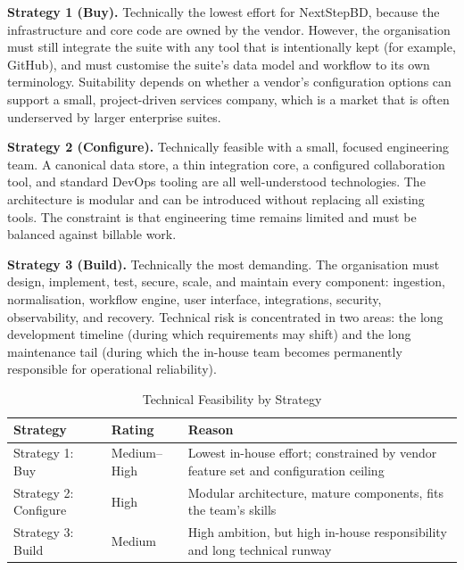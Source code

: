 \documentclass[12pt,a4paper]{report}
\begin{document}
\textbf{Strategy 1 (Buy).} Technically the lowest effort for NextStepBD, because the
infrastructure and core code are owned by the vendor. However, the organisation must still
integrate the suite with any tool that is intentionally kept (for example, GitHub), and must
customise the suite's data model and workflow to its own terminology. Suitability depends on
whether a vendor's configuration options can support a small, project-driven services
company, which is a market that is often underserved by larger enterprise suites.

\textbf{Strategy 2 (Configure).} Technically feasible with a small, focused engineering team.
A canonical data store, a thin integration core, a configured collaboration tool, and standard
DevOps tooling are all well-understood technologies. The architecture is modular and can be
introduced without replacing all existing tools. The constraint is that engineering time
remains limited and must be balanced against billable work.

\textbf{Strategy 3 (Build).} Technically the most demanding. The organisation must design,
implement, test, secure, scale, and maintain every component: ingestion, normalisation,
workflow engine, user interface, integrations, security, observability, and recovery.
Technical risk is concentrated in two areas: the long development timeline (during which
requirements may shift) and the long maintenance tail (during which the in-house team becomes
permanently responsible for operational reliability).

\begin{table}[H]
\centering
\caption{Technical Feasibility by Strategy}
\label{tab:tech-feasibility}
\small
\renewcommand{\arraystretch}{1.20}
\begin{tabularx}{\textwidth}{>{\raggedright\arraybackslash}p{3.2cm}
                                >{\centering\arraybackslash}p{1.8cm}
                                >{\raggedright\arraybackslash}X}
\toprule
\textbf{Strategy} & \textbf{Rating} & \textbf{Reason} \\
\midrule
Strategy 1: Buy & Medium--High & Lowest in-house effort; constrained by vendor feature set and configuration ceiling \\
Strategy 2: Configure & High & Modular architecture, mature components, fits the team's skills \\
Strategy 3: Build & Medium & High ambition, but high in-house responsibility and long technical runway \\
\bottomrule
\end{tabularx}
\end{table}
\end{document}
